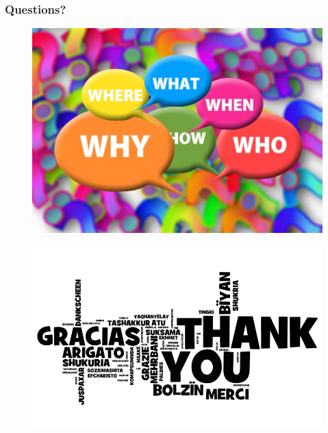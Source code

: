 \documentclass[aspectratio=169]{beamer}
\begin{document}
\begin{frame}
  \frametitle{Questions?}
  \begin{figure}
    \includegraphics[height=.7\textheight]{./src/img/010_-_questions.jpg}
  \end{figure}
\end{frame}

\begin{frame}
  \begin{figure}
    \includegraphics[height=.7\textheight]{./src/img/011_-_thanks.jpg}
  \end{figure}
\end{frame}

\end{document}
